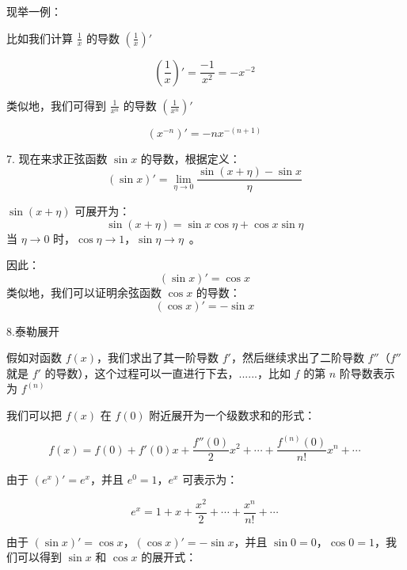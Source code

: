 现举一例：

比如我们计算 $\frac{1}{x}$ 的导数 $\left( \frac{1}{x} \right)'$ 

\begin{equation}
\left( \frac{1}{x} \right)' = \frac{-1}{x^2} = -x^{-2}~
\end{equation}

类似地，我们可得到 $\frac{1}{x^n}$ 的导数 $\left( \frac{1}{x^n} \right)'$~

\begin{equation}
(x^{-n})' = -nx^{-(n+1)} \tag{51}~
\end{equation}

7. 现在来求正弦函数 $\sin x$ 的导数，根据定义：
\begin{equation}
(\sin x)' = \lim_{\eta \to 0} \frac{\sin(x + \eta) - \sin x}{\eta}~
\end{equation}

$\sin(x + \eta)$ 可展开为：
\begin{equation}
\sin(x + \eta) = \sin x \cos \eta + \cos x \sin \eta~
\end{equation}
当 $\eta \to 0$ 时，$\cos \eta \to 1$，$\sin \eta \to \eta$~。

因此：
\begin{equation}
(\sin x)' = \cos x \tag{52}~
\end{equation}
类似地，我们可以证明余弦函数 $\cos x$ 的导数：
\begin{equation}
(\cos x)' = -\sin x \tag{53}~
\end{equation}

8.泰勒展开

假如对函数 $f(x)$，我们求出了其一阶导数 $f'$，然后继续求出了二阶导数 $f''$（$f''$ 就是 $f'$ 的导数），这个过程可以一直进行下去，......，比如 $f$ 的第 $n$ 阶导数表示为 $f^{(n)}$

我们可以把 $f(x)$ 在 $f(0)$ 附近展开为一个级数求和的形式：

\begin{equation}
f(x) = f(0) + f'(0)x + \frac{f''(0)}{2} x^2 + \cdots + \frac{f^{(n)}(0)}{n!} x^n + \cdots~
\end{equation}

由于 $(e^x)' = e^x$，并且 $e^0 = 1$，$e^x$ 可表示为：

\begin{equation}
e^x = 1 + x + \frac{x^2}{2} + \cdots + \frac{x^n}{n!} + \cdots~
\end{equation}

由于 $(\sin x)' = \cos x$，$(\cos x)' = -\sin x$，并且 $\sin 0 = 0$，$\cos 0 = 1$，我们可以得到 $\sin x$ 和 $\cos x$ 的展开式：

